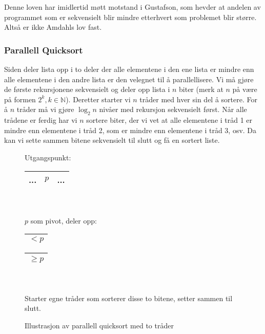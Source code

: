 Denne loven har imidlertid møtt motstand i Gustafson, som hevder at andelen av
programmet som er sekvensielt blir mindre etterhvert som problemet blir større.
Altså er ikke Amdahls lov fast.

\subsubsection{Parallell Quicksort}\label{parquick}
Siden  deler lista opp i to deler der alle elementene i den ene lista er mindre enn alle elementene i den andre lista er den velegnet til å parallellisere. Vi må gjøre de første rekursjonene sekvensielt og deler opp lista i $ n $ biter (merk at $ n $ på være på formen $ 2^k, k\in \mathbb{N} $). Deretter starter vi $ n $ tråder med hver sin del å sortere. For å $ n $ tråder må vi gjøre $ \log_2 n $ nivåer med rekursjon sekvensielt først. Når alle trådene er ferdig har vi $ n $ sortere biter, der vi vet at alle elementene i tråd 1 er mindre enn elementene i tråd 2, som er mindre enn elementene i tråd 3, osv. Da kan vi sette sammen bitene sekvensielt til slutt og få en sortert liste. 
\begin{figure}[H]
\caption{Illustrasjon av parallell quicksort med to tråder}
\centering
Utgangspunkt:\\
\begin{tabular}{| c |c| c |}
\hline
\quad\quad\quad\quad...\quad\quad\quad\quad&$ p $&\quad\quad\quad\quad...\quad\quad\quad\quad\\
\hline
\end{tabular}\\
~\\$ p $ som pivot, deler opp:\\
\begin{tabular}{| c |}
\hline
\quad\quad\quad\quad$ < p $\quad\quad\quad\quad\quad\\
\hline
\end{tabular}\quad\quad
\begin{tabular}{| c |}
\hline
\quad\quad\quad\quad$ \geq p $\quad\quad\quad\quad\quad\\
\hline
\end{tabular}\\
~\\ Starter egne tråder som sorterer disse to bitene, setter sammen til slutt.
\end{figure}

